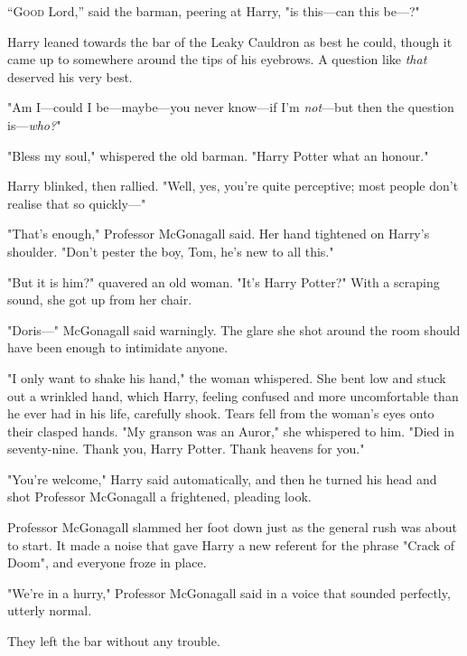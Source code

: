
\lettrine{“G}{ood} Lord,'' said the barman, peering at Harry, "is this---can this be---?"

Harry leaned towards the bar of the Leaky Cauldron as best he could, though it
came up to somewhere around the tips of his eyebrows. A question like
\emph{that} deserved his very best.

"Am I---could I be---maybe---you never know---if I'm \emph{not}---but then the
question is---\emph{who?}"

"Bless my soul," whispered the old barman. "Harry Potter{\el} what an
honour."

Harry blinked, then rallied. "Well, yes, you're quite perceptive; most people
don't realise that so quickly---"

"That's enough," Professor McGonagall said. Her hand tightened on Harry's
shoulder. "Don't pester the boy, Tom, he's new to all this."

"But it is him?" quavered an old woman. "It's Harry Potter?" With a scraping
sound, she got up from her chair.

"Doris---" McGonagall said warningly. The glare she shot around the room should
have been enough to intimidate anyone.

"I only want to shake his hand," the woman whispered. She bent low and stuck
out a wrinkled hand, which Harry, feeling confused and more uncomfortable than
he ever had in his life, carefully shook. Tears fell from the woman's eyes onto
their clasped hands. "My granson was an Auror," she whispered to him. "Died in
seventy-nine. Thank you, Harry Potter. Thank heavens for you."

"You're welcome," Harry said automatically, and then he turned his head and
shot Professor McGonagall a frightened, pleading look.

Professor McGonagall slammed her foot down just as the general rush was about
to start. It made a noise that gave Harry a new referent for the phrase "Crack
of Doom", and everyone froze in place.

"We're in a hurry," Professor McGonagall said in a voice that sounded
perfectly, utterly normal.

They left the bar without any trouble.

